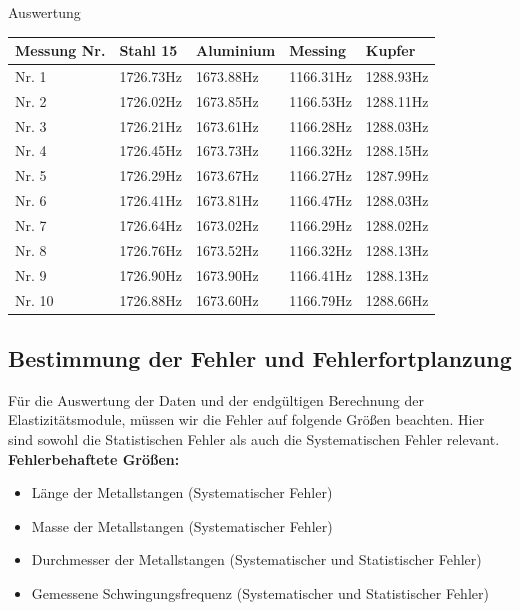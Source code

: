 \documentclass[twoside]{protokoll}
\begin{document}
\begin{aufgabe}{Auswertung}
 \begin{table}[H]
        \centering
        \begin{tabularx}{1.00\textwidth}{X X X X X} %
            \toprule
            \textbf{Messung Nr.} & \textbf{Stahl 15} & \textbf{Aluminium} & \textbf{Messing} & \textbf{Kupfer} \\
            \midrule
                Nr. 1 & 1726.73Hz & 1673.88Hz & 1166.31Hz & 1288.93Hz \\
                Nr. 2 & 1726.02Hz & 1673.85Hz & 1166.53Hz & 1288.11Hz \\
                Nr. 3 & 1726.21Hz & 1673.61Hz & 1166.28Hz & 1288.03Hz \\
                Nr. 4 & 1726.45Hz & 1673.73Hz & 1166.32Hz & 1288.15Hz \\
                Nr. 5 & 1726.29Hz & 1673.67Hz & 1166.27Hz & 1287.99Hz \\
                Nr. 6 & 1726.41Hz & 1673.81Hz & 1166.47Hz & 1288.03Hz \\
                Nr. 7 & 1726.64Hz & 1673.02Hz & 1166.29Hz & 1288.02Hz \\
                Nr. 8 & 1726.76Hz & 1673.52Hz & 1166.32Hz & 1288.13Hz \\
                Nr. 9 & 1726.90Hz & 1673.90Hz & 1166.41Hz & 1288.13Hz \\
                Nr. 10& 1726.88Hz & 1673.60Hz & 1166.79Hz & 1288.66Hz \\
            \bottomrule
        \end{tabularx}
        \label{tab:mytable}
    \end{table}

\subsection{Bestimmung der Fehler und Fehlerfortplanzung}

Für die Auswertung der Daten und der endgültigen Berechnung der Elastizitätsmodule, müssen wir die Fehler 
auf folgende Größen beachten. 
Hier sind sowohl die Statistischen Fehler als auch die Systematischen Fehler relevant.\\


\textbf{Fehlerbehaftete Größen:}
\begin{itemize}
\item Länge der Metallstangen (Systematischer Fehler)
\item Masse der Metallstangen (Systematischer Fehler)
\item Durchmesser der Metallstangen (Systematischer und Statistischer Fehler)
\item Gemessene Schwingungsfrequenz (Systematischer und Statistischer Fehler)
\end{itemize}


\end{aufgabe}
\end{document}
